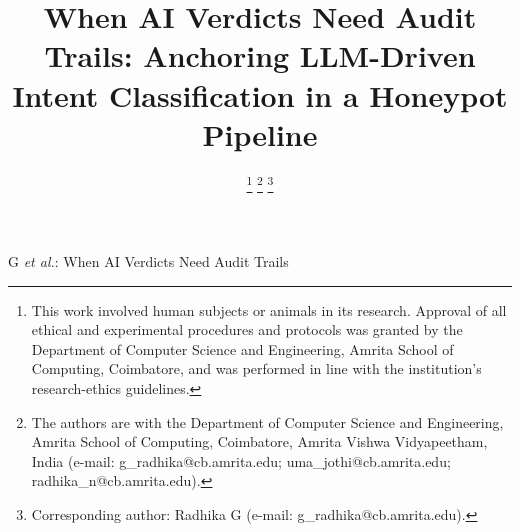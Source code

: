\documentclass[journal,10pt,twocolumn]{IEEEtran}
\begin{document}
\title{When AI Verdicts Need Audit Trails: Anchoring LLM-Driven Intent Classification in a Honeypot Pipeline}

\author{
\thanks{This work involved human subjects or animals in its research. Approval of all ethical and experimental procedures and protocols was granted by the Department of Computer Science and Engineering, Amrita School of Computing, Coimbatore, and was performed in line with the institution's research-ethics guidelines.}
\thanks{The authors are with the Department of Computer Science and
Engineering, Amrita School of Computing, Coimbatore, Amrita Vishwa
Vidyapeetham, India (e-mail: g\_radhika@cb.amrita.edu; uma\_jothi@cb.amrita.edu; radhika\_n@cb.amrita.edu).}
\thanks{Corresponding author: Radhika G (e-mail: g\_radhika@cb.amrita.edu).}}

%
{G \MakeLowercase{\textit{et al.}}: When AI Verdicts Need Audit Trails}

\maketitle
\thispagestyle{fancy}
\end{document}
